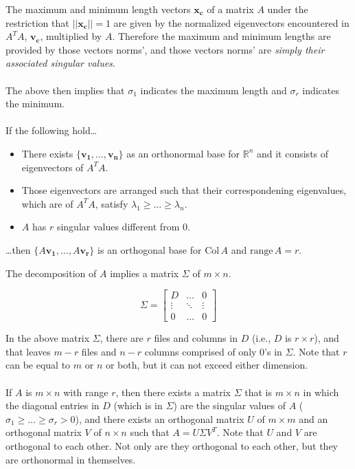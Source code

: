 \documentclass[12pt]{article}
\newcommand{\R}{\mathbb{R}}
\newcommand{\bm}[1]{\mathbf{{#1}}}
\newcommand{\mb}{\begin{bmatrix}}
\newcommand{\me}{\end{bmatrix}}
\newcommand{\set}[1]{\{{#1}\}}
\newcommand{\norm}[1]{||{#1}||}
\begin{document}
The maximum and minimum length vectors $\bm{x_c}$ of a matrix $A$ under the restriction that $\norm{\bm{x_c}} = 1$ are given
by the normalized eigenvectors encountered in $A^TA$, $\bm{v_c}$, multiplied by $A$. Therefore the maximum and minimum lengths are provided
by those vectors norms', and those vectors norms' are \emph{simply their associated singular values}. \\ \\

The above then implies that $\sigma_1$ indicates the maximum length and $\sigma_r$ indicates the minimum. \\ \\

If the following hold\dots

\begin{itemize}
    \item There exists $\set{\bm{v_1,\dots,v_n}}$ as an orthonormal base for $\R^n$ and it consists of eigenvectors of $A^TA$.
    \item Those eigenvectors are arranged such that their correspondening eigenvalues, which are of $A^TA$, satisfy $\lambda_1 \geq \dots \geq \lambda_n$.
    \item $A$ has $r$ singular values different from $0$.
\end{itemize}

\dots then $\set{A\bm{v_1},\dots,A\bm{v_r}}$ is an orthogonal base for $\textrm{Col}\,A$ and $\textrm{range}\,A = r$.

The decomposition of $A$ implies a matrix $\Sigma$ of $m \times n$.

$$\Sigma = \mb D & \dots & 0 \\ \vdots & \ddots & \vdots \\ 0 & \dots & 0 \me$$

In the above matrix $\Sigma$, there are $r$ files and columns in $D$ (i.e., $D$ is $r \times r$), and that leaves $m-r$ files and $n-r$ columns comprised
of only $0$'s in $\Sigma$. Note that $r$ can be equal to $m$ or $n$ or both, but it can not exceed either dimension. \\ \\

If $A$ is $m \times n$ with range $r$, then there exists a matrix $\Sigma$ that is $m \times n$ in which the diagonal entries in
$D$ (which is in $\Sigma$) are the singular values of $A$ ($\sigma_1 \geq \dots \geq \sigma_r > 0$), and there exists an
orthogonal matrix $U$ of $m \times m$ and an orthogonal matrix $V$ of $n \times n$ such that $A = U\Sigma V^T$. Note that $U$ and $V$ are orthogonal to each other.
Not only are they orthogonal to each other, but they are orthonormal in themselves.
\end{document}
